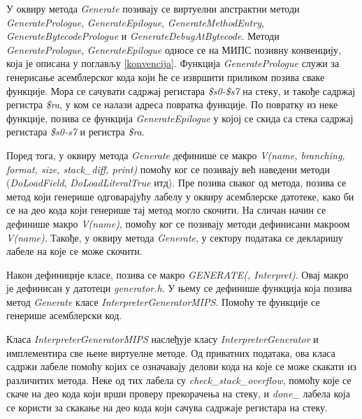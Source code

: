\documentclass[12pt,oneside]{memoir}
\begin{document}
У оквиру метода \textit{Generate} позивају се виртуелни апстрактни методи \textit{GeneratePrologue}, \textit{GenerateEpilogue}, \textit{GenerateMethodEntry}, \textit{GenerateBytecodePrologue} и \textit{GenerateDebugAtBytecode}. Методи \textit{GeneratePrologue}, \textit{GenerateEpilogue} односе се на МИПС позивну конвенцију, која је описана у поглављу \ref{konvencija}. Функција \textit{GeneratePrologue} служи за генерисање асемблерског кода који ће се извршити приликом позива сваке функције. Мора се сачувати садржај регистара \textit{\$s0-\$s7} на стеку, и такође садржај регистра \textit{\$ra}, у ком се налази адреса повратка функције. По повратку из неке функције, позива се функција \textit{GenerateEpilogue} у којој се скида са стека садржај регистара \textit{\$s0-s7} и регистра \textit{\$ra}.

Поред тога, у оквиру метода \textit{Generate} дефинише се макро \textit{V(name, branching, format, size, stack\_diff, print)} помоћу ког се позивају већ наведени методи (\textit{DoLoadField}, \textit{DoLoadLiteralTrue} итд). Пре позива сваког од метода, позива се метод који генерише одговарајућу лабелу у оквиру асемблерске датотеке, како би се на део кода који генерише тај метод могло скочити. На сличан начин се дефинише макро \textit{V(name)}, помоћу ког се позивају методи дефинисани макроом \textit{V(name)}. Такође, у оквиру метода \textit{Generate}, у сектору података се декларишу лабеле на које се може скочити.

Након дефиниције класе, позива се макро \textit{GENERATE(, Interpret)}. Овај макро је дефинисан у датотеци \textit{generator.h}. У њему се дефинише функција која позива метод \textit{Generate} класе \textit{InterpreterGeneratorMIPS}. Помоћу те функције се генерише асемблерски код.

Класа \textit{InterpreterGeneratorMIPS} наслеђује класу \textit{InterpreterGenerator} и имплементира све њене виртуелне методе. 
Од приватних података, ова класа садржи лабеле помоћу којих се означавају делови кода на које се може скакати из различитих метода. Неке од тих лабела су \textit{check\_stack\_overflow}, помоћу које се скаче на део кода који врши проверу прекорачења на стеку, и \textit{done\_} лабела која се користи за скакање на део кода који сачува садржаје регистара на стеку.
\end{document}
